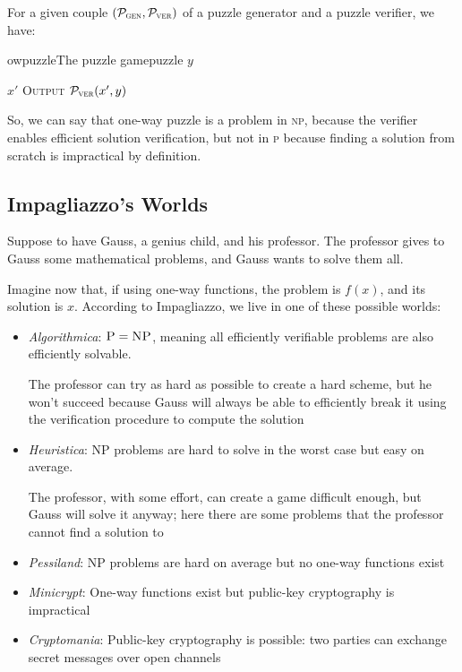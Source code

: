 For a given couple $(\mathcal{P}_\textsc{gen},\mathcal{P}_\textsc{ver})$ of a puzzle generator and a puzzle verifier, we have:

\begin{cryptogame}{owpuzzle}{The puzzle game}{puzzle}
    {$y$}
    {}

    \postlevel

    \send{}
    {$x'$}
    {\textsc{Output} $\mathcal{P}_\textsc{ver}(x', y)$}

\end{cryptogame}

So, we can say that one-way puzzle is a problem in \textsc{np}, because the verifier enables efficient solution verification, but not in \textsc{p} because finding a solution from scratch is impractical by definition.

\subsection{Impagliazzo's Worlds}

Suppose to have Gauss, a genius child, and his professor. The professor gives to Gauss some mathematical problems, and Gauss wants to solve them all.

Imagine now that, if using one-way functions, the problem is $f(x)$, and its solution is $x$. According to Impagliazzo, we live in one of these possible worlds:
\begin{itemize}
    \item \textit{Algorithmica}: $\textsc{P} = \textsc{NP}$, meaning all efficiently verifiable problems are also efficiently solvable. 
    
    The professor can try as hard as possible to create a hard scheme, but he won't succeed because Gauss will always be able to efficiently break it using the verification procedure to compute the solution

    \item \textit{Heuristica}: \textsc{NP} problems are hard to solve in the worst case but easy on average. 
    
    The professor, with some effort, can create a game difficult enough, but Gauss will solve it anyway; here there are some problems that the professor cannot find a solution to

    \item \textit{Pessiland}: \textsc{NP} problems are hard on average but no one-way functions exist
    
    \item \textit{Minicrypt}: One-way functions exist but public-key cryptography is impractical
    
    \item \textit{Cryptomania}: Public-key cryptography is possible: two parties can exchange secret messages over open channels
\end{itemize}
    
